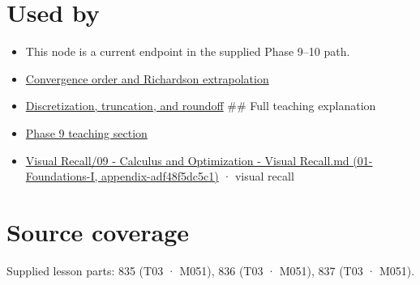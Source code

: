 \section{Used by}\label{appendix-80521eae6b71-used-by}

\begin{itemize}
\item
  This node is a current endpoint in the supplied Phase 9--10 path.
\item
  \hyperref[appendix-aca80b6bf17a]{Convergence order and Richardson extrapolation}
\item
  \hyperref[appendix-6b0648b2b8e8]{Discretization, truncation, and roundoff} \#\# Full teaching explanation
\item
  \href{Continuous\%20Notes/Computing\%20Foundations\%20-\%20From\%20Bits\%20to\%20C++\%20and\%20Systems\%20APIs\#Integration\%20and\%20quadrature}{Phase 9 teaching section}
\item
  \href{../01-Foundations-I/main.pdf\#nameddest=appendix-adf48f5dc5c1}{Visual Recall/09 - Calculus and Optimization - Visual Recall.md (01-Foundations-I, appendix-adf48f5dc5c1)} · visual recall
\end{itemize}

\section{Source coverage}\label{appendix-80521eae6b71-source-coverage}

Supplied lesson parts: 835 (T03 · M051), 836 (T03 · M051), 837 (T03 · M051).
